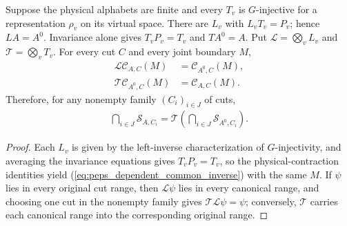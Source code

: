 \begin{lemma}%
    \label{thm:peps_dependent_common_inverse}
    \leanok
    Suppose the physical alphabets are finite and every $T_v$ is
    $G$-injective for a representation $\rho_v$ on its virtual space.
    There are $L_v$ with $L_vT_v=P_v$; hence $LA=A^0$.
    Invariance alone gives $T_vP_v=T_v$ and $TA^0=A$.
    Put $\mathcal L=\bigotimes_vL_v$ and $\mathcal T=\bigotimes_vT_v$.
    For every cut $C$ and every joint boundary $M$,
    \begin{align}
        \mathcal L\mathcal C_{A,C}(M)   & =\mathcal C_{A^0,C}(M),
        \label{eq:peps_dependent_common_inverse}                         \\
        \mathcal T\mathcal C_{A^0,C}(M) & =\mathcal C_{A,C}(M).\nonumber
    \end{align}
    Therefore, for any nonempty family $(C_i)_{i\in J}$ of cuts,
    \begin{align}
        \bigcap_{i\in J}\mathcal S_{A,C_i}
        =\mathcal T\left(\bigcap_{i\in J}\mathcal S_{A^0,C_i}\right).
        \label{eq:peps_dependent_cut_transport}
    \end{align}
\end{lemma}
\begin{proof}\leanok
    Each $L_v$ is given by the left-inverse characterization of $G$-injectivity,
    and averaging the invariance equations gives $T_vP_v=T_v$, so
    the physical-contraction identities yield
    (\ref{eq:peps_dependent_common_inverse}) with the same $M$.
    If $\psi$ lies in every original cut range, then $\mathcal L\psi$
    lies in every canonical range, and choosing one cut in the nonempty family
    gives $\mathcal T\mathcal L\psi=\psi$;
    conversely, $\mathcal T$ carries each canonical range into the
    corresponding original range.
\end{proof}

